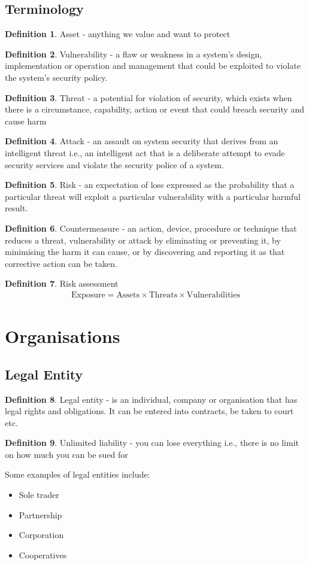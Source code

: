 \documentclass[a4paper]{article}
\theoremstyle{plain}
\theoremstyle{definition}
\newtheorem{defn}{Definition}[section]
\theoremstyle{remark}
\begin{document}
\subsection{Terminology}
\begin{defn}
	Asset - anything we value and want to protect
\end{defn}
\begin{defn}
	Vulnerability - a flaw or weakness in a system's design, implementation or operation and management that could be exploited to violate the system's security policy.
\end{defn}
\begin{defn}
	Threat - a potential for violation of security, which exists when there is a circumstance, capability, action or event that could breach security and cause harm
\end{defn}
\begin{defn}
	Attack - an assault on system security that derives from an intelligent threat i.e., an intelligent act that is a deliberate attempt to evade security services and violate the security police of a system.
\end{defn}
\begin{defn}
	Risk - an expectation of loss expressed as the probability that a particular threat will exploit a particular vulnerability with a particular harmful result. 
\end{defn}
\begin{defn}
	Countermeasure - an action, device, procedure or technique that reduces a threat, vulnerability or attack by eliminating or preventing it, by minimising the harm it can cause, or by discovering and reporting it as that corrective action can be taken.
\end{defn}
\begin{defn}
	Risk assessment
	\begin{align*}
\text{Exposure} = \text{Assets} \times  \text{Threats} \times \text{Vulnerabilities}
	\end{align*}
\end{defn}
\section{Organisations}
\subsection{Legal Entity}
\begin{defn}
	Legal entity - is an individual, company or organisation that has legal rights and obligations. It can be entered into contracts, be taken to court etc.
\end{defn}
\begin{defn}
	Unlimited liability - you can lose everything i.e., there is no limit on how much you can be sued for
\end{defn}
Some examples of legal entities include:
\begin{itemize}
	\item Sole trader
	\item Partnership
	\item Corporation
	\item Cooperatives
\end{itemize}
\end{document}
